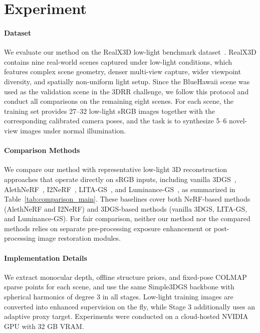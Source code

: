 \section{Experiment}
\label{subsec:experiment}

\paragraph*{Dataset}
We evaluate our method on the RealX3D low-light benchmark dataset~\cite{liu2025realx3d}.
RealX3D contains nine real-world scenes captured under low-light conditions,
which features complex scene geometry, denser multi-view capture, wider viewpoint
diversity, and spatially non-uniform light setup. Since the BlueHawaii scene was
used as the validation scene in the 3DRR challenge, we follow this protocol and
conduct all comparisons on the remaining eight scenes. For each scene, the
training set provides 27--32 low-light sRGB images together with the corresponding
calibrated camera poses, and the task is to synthesize 5--6 novel-view
images under normal illumination.

\paragraph*{Comparison Methods}
We compare our method with representative low-light 3D reconstruction approaches
that operate directly on sRGB inputs, including vanilla 3DGS~\cite{kerbl20233d},
AlethNeRF~\cite{cui2024aleth}, I2NeRF~\cite{liu2025i2nerf}, LITA-GS~\cite{zhou2025lita},
and Luminance-GS~\cite{cui2025luminance}, as summarized in Table~\ref{tab:comparison_main}. These
baselines cover both NeRF-based methods (AlethNeRF and I2NeRF) and 3DGS-based
methods (vanilla 3DGS, LITA-GS, and Luminance-GS). For fair comparison, neither
our method nor the compared methods relies on separate pre-processing exposure
enhancement or post-processing image restoration modules.

\paragraph*{Implementation Details}
We extract monocular depth, offline structure priors, and fixed-pose COLMAP sparse
points for each scene, and use the same Simple3DGS backbone with spherical harmonics
of degree 3 in all stages. Low-light training images are converted into enhanced
supervision on the fly, while Stage 3 additionally uses an adaptive proxy target.
Experiments were conducted on a cloud-hosted NVIDIA GPU with 32 GB VRAM.

